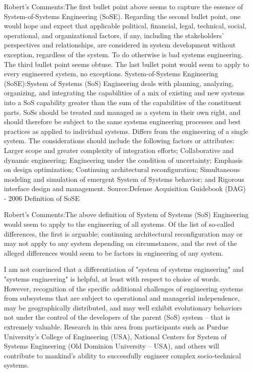 Robert's Comments:The first bullet point above seems to capture the essence of System-of-Systems Engineering (SoSE). Regarding the second bullet point, one would hope and expect that applicable political, financial, legal, technical, social, operational, and organizational factors, if any, including the stakeholders' perspectives and relationships, are considered in system development without exception, regardless of the system. To do otherwise is bad systems engineering. The third bullet point seems obtuse. The last bullet point would seem to apply to every engineered system, no exceptions.
System-of-Systems Engineering (SoSE):System of Systems (SoS) Engineering deals with planning, analyzing, organizing, and integrating the capabilities of a mix of existing and new systems into a SoS capability greater than the sum of the capabilities of the constituent parts.
SoSs should be treated and managed as a system in their own right, and should therefore be subject to the same systems engineering processes and best practices as applied to individual systems.
Differs from the engineering of a single system. The considerations should include the following factors or attributes:
Larger scope and greater complexity of integration efforts;
Collaborative and dynamic engineering;
Engineering under the condition of uncertainty;
Emphasis on design optimization;
Continuing architectural reconfiguration;
Simultaneous modeling and simulation of emergent System of Systems behavior; and
Rigorous interface design and management.
Source:Defense Acquisition Guidebook (DAG) - 2006 Definition of SoSE

Robert's Comments:The above definition of System of Systems (SoS) Engineering would seem to apply to the engineering of all systems. Of the list of so-called differences, the first is arguable; continuing architectural reconfiguration may or may not apply to any system depending on circumstances, and the rest of the alleged differences would seem to be factors in engineering of any system.

I am not convinced that a differentiation of "system of systems engineering" and "systems engineering" is helpful, at least with respect to choice of words. However, recognition of the specific additional challenges of engineering systems from subsystems that are subject to operational and managerial independence, may be geographically distributed, and may well exhibit evolutionary behaviors not under the control of the developers of the parent (SoS) system – that is extremely valuable. Research in this area from participants such as Purdue University's College of Engineering (USA), National Centers for System of Systems Engineering (Old Dominion University – USA), and others will contribute to mankind's ability to successfully engineer complex socio-technical systems.


